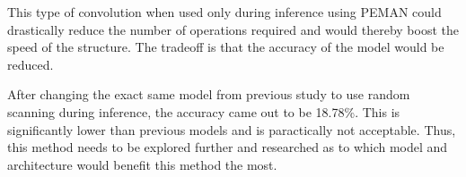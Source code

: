 This type of convolution when used only during inference using PEMAN could drastically reduce the number of operations required and would thereby boost the speed of the structure. The tradeoff is that the accuracy of the model would be reduced.

After changing the exact same model from previous study to use random scanning during inference, the accuracy came out to be 18.78\%. This is significantly lower than previous models and is paractically not acceptable. Thus, this method needs to be explored further and researched as to which model and architecture would benefit this method the most.